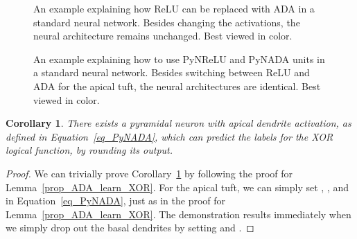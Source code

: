 \documentclass[pdflatex,sn-mathphys]{sn-jnl}
\theoremstyle{thmstyleone}
\newtheorem{corollary}[thm]{Corollary}
\theoremstyle{thmstyletwo}\newtheorem{example}{Example}\newtheorem{remark}{Remark}
\theoremstyle{thmstylethree}\newtheorem{definition}{Definition}\DeclareMathOperator{\sinc}{sinc}
\begin{document}
\begin{figure}[!t]
\begin{center}
\centering
{}
\hspace{0.06\linewidth}
\caption{An example explaining how ReLU can be replaced with ADA in a standard neural network. Besides changing the activations, the neural architecture remains unchanged. Best viewed in color.}
\label{fig_mlp_relu_vs_ada}
\end{center}
\end{figure}

\begin{figure}[!t]
\begin{center}
\centering
{}
\hspace{0.06\linewidth}
\caption{An example explaining how to use PyNReLU and PyNADA units in a standard neural network. Besides switching between ReLU and ADA for the apical tuft, the neural architectures are identical. Best viewed in color.}
\label{fig_mlp_pynrelu_vs_pynada}
\end{center}
\end{figure}

\begin{corollary}\label{prop_PyNADA_learn_XOR}
There exists a pyramidal neuron with apical dendrite activation, as defined in Equation~\eqref{eq_PyNADA}, which can predict the labels for the XOR logical function, by rounding its output.
\end{corollary}

\begin{proof}
We can trivially prove Corollary~\ref{prop_PyNADA_learn_XOR} by following the proof for Lemma~\ref{prop_ADA_learn_XOR}. For the apical tuft, we can simply set\vspace{0.1cm} , ,  and  in Equation~\eqref{eq_PyNADA}, just as in the proof for Lemma~\ref{prop_ADA_learn_XOR}. The demonstration results immediately when we simply drop out the basal dendrites\vspace{0.1cm} by setting  and .
\end{proof}
\end{document}
